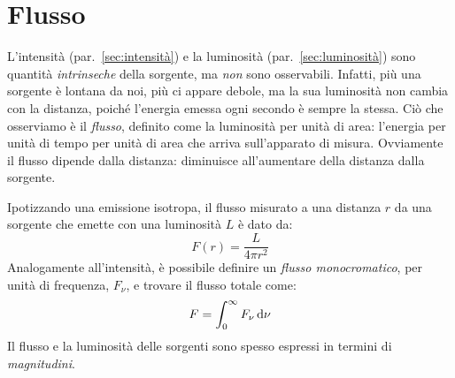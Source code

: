 \section{Flusso}\label{sec:flusso}
L'intensità (par.~\ref{sec:intensità}) e la luminosità (par.~\ref{sec:luminosità}) sono quantità \emph{intrinseche} della sorgente, ma \emph{non} sono osservabili. Infatti, più una sorgente è lontana da noi, più ci appare debole, ma la sua luminosità non cambia con la distanza, poiché l'energia emessa ogni secondo è sempre la stessa. Ciò che osserviamo è il \emph{flusso}, definito come la luminosità per unità di area: l'energia per unità di tempo per unità di area che arriva sull'apparato di misura. Ovviamente il flusso dipende dalla distanza: diminuisce all'aumentare della distanza dalla sorgente.

Ipotizzando una emissione isotropa, il flusso misurato a una distanza $r$ da una sorgente che emette con una luminosità $L$ è dato da:
\begin{equation}\label{eq:flusso}
    F(r) = \frac{L}{4 \pi r^2}
\end{equation}
Analogamente all'intensità, è possibile definire un \emph{flusso monocromatico}, per unità di frequenza, $F_\nu$, e trovare il flusso totale come:
\[
    F = \int_0^\infty F_\nu \mathop{\mathrm{{}d}}\mathopen{} \nu
\]
Il flusso e la luminosità delle sorgenti sono spesso espressi in termini di \emph{magnitudini}.